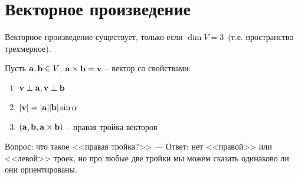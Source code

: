 \section{Векторное произведение}

\begin{remark}
    Векторное произведение существует, только если $\dim V = 3$~(т.е. пространство
    трехмерное).
\end{remark}

\begin{definition}[Формальное]
    Пусть $\mathbf{a}, \mathbf{b} \in V$, $\mathbf{a} \times \mathbf{b} = \mathbf{v}$ -- вектор со свойствами:
    \begin{enumerate}
        \item $\mathbf{v} \perp \mathbf{a}, \mathbf{v} \perp \mathbf{b}$
        \item $|\mathbf{v}| = |\mathbf{a}| |\mathbf{b}| \sin \alpha$
        \item $(\mathbf{a}, \mathbf{b}, \mathbf{a} \times \mathbf{b})$ -- правая тройка векторов
    \end{enumerate}
\end{definition}

Вопрос: что такое <<правая тройка?>> --- Ответ: нет <<правой>> или <<левой>> троек,
но про любые две тройки мы можем сказать одинаково ли они ориентированы.

